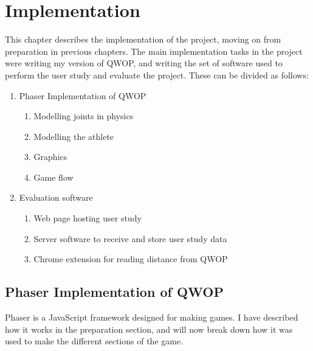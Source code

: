 \documentclass[12pt,a4paper,twoside,openright]{report}
\begin{document}




\chapter{Implementation}

This chapter describes the implementation of the project, moving on from preparation in previous chapters. The main implementation tasks in the project were writing my version of QWOP, and writing the set of software used to perform the user study and evaluate the project. These can be divided as follows:

\begin{enumerate}
  \item Phaser Implementation of QWOP
	\begin{enumerate}
      \item Modelling joints in physics
  	  \item Modelling the athlete
  	  \item Graphics
  	  \item Game flow
	\end{enumerate}
  \item Evaluation software
    \begin{enumerate}
      \item Web page hosting user study
      \item Server software to receive and store user study data
      \item Chrome extension for reading distance from QWOP
    \end{enumerate}
\end{enumerate}

\section{Phaser Implementation of QWOP}

Phaser is a JavaScript framework designed for making games. I have described how it works in the preparation section, and will now break down how it was used to make the different sections of the game.
\end{document}

